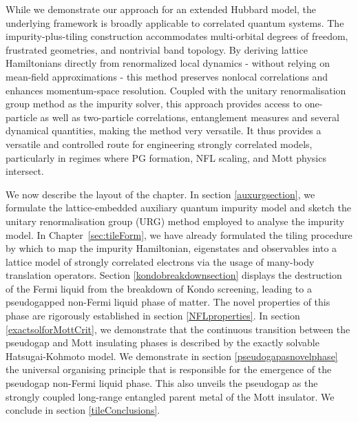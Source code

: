 While we demonstrate our approach for an extended Hubbard model, the underlying framework is broadly applicable to correlated quantum systems. The impurity-plus-tiling construction accommodates multi-orbital degrees of freedom, frustrated geometries, and nontrivial band topology. By deriving lattice Hamiltonians directly from renormalized local dynamics - without relying on mean-field approximations - this method preserves nonlocal correlations and enhances momentum-space resolution. Coupled with the unitary renormalisation group method as the impurity solver, this approach provides access to one-particle as well as two-particle correlations, entanglement measures and several dynamical quantities, making the method very versatile. It thus provides a versatile and controlled route for engineering strongly correlated models, particularly in regimes where PG formation, NFL scaling, and Mott physics intersect.

We now describe the layout of the chapter. In section \ref{auxurgsection}, we formulate the lattice-embedded auxiliary quantum impurity model and sketch the unitary renormalisation group (URG) method employed to analyse the impurity model. In Chapter~\ref{sec:tileForm}, we have already formulated the tiling procedure by which to map the impurity Hamiltonian, eigenstates and observables into a lattice model of strongly correlated electrons via the usage of many-body translation operators. Section \ref{kondobreakdownsection} displays the destruction of the Fermi liquid from the breakdown of Kondo screening, leading to a pseudogapped non-Fermi liquid phase of matter. The novel properties of this phase are rigorously established in section \ref{NFLproperties}. In section \ref{exactsolforMottCrit}, we demonstrate that the continuous transition between the pseudogap and Mott insulating phases is described by the exactly solvable Hatsugai-Kohmoto model. We demonstrate in section \ref{pseudogapasnovelphase} the universal organising principle that is responsible for the emergence of the pseudogap non-Fermi liquid phase. This also unveils the pseudogap as the strongly coupled long-range entangled parent metal of the Mott insulator. We conclude in section \ref{tileConclusions}.

